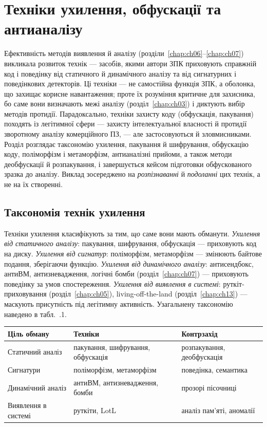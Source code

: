 \chapter{Техніки ухилення, обфускації та антианалізу}
\label{chap:ch08}

Ефективність методів виявлення й аналізу (розділи~\ref{chap:ch06}--\ref{chap:ch07}) викликала розвиток технік  --- засобів, якими автори ЗПК приховують справжній код і поведінку від статичного й динамічного аналізу та від сигнатурних і поведінкових детекторів. Ці техніки --- не самостійна функція ЗПК, а оболонка, що захищає корисне навантаження; проте їх розуміння критичне для захисника, бо саме вони визначають межі аналізу (розділ~\ref{chap:ch03}) і диктують вибір методів протидії. Парадоксально, техніки захисту коду (обфускація, пакування) походять із легітимної сфери --- захисту інтелектуальної власності й протидії зворотному аналізу комерційного ПЗ, --- але застосовуються й зловмисниками. Розділ розглядає таксономію ухилення, пакування й шифрування, обфускацію коду, поліморфізм і метаморфізм, антианалізні прийоми, а також методи деобфускації й розпакування, і завершується кейсом підготовки обфускованого зразка до аналізу. Виклад зосереджено на \emph{розпізнаванні} й \emph{подоланні} цих технік, а не на їх створенні.

\section{Таксономія технік ухилення}\label{sec:ch08-taxonomy}

Техніки ухилення класифікують за тим, \emph{що} саме вони мають обманути. \emph{Ухилення від статичного аналізу}: пакування, шифрування, обфускація --- приховують код на диску. \emph{Ухилення від сигнатур}: поліморфізм, метаморфізм --- змінюють байтове подання, зберігаючи функцію. \emph{Ухилення від динамічного аналізу}: антисендбокс, антиВМ, антизневадження, логічні бомби (розділ~\ref{chap:ch07}) --- приховують поведінку за умов спостереження. \emph{Ухилення від виявлення в системі}: руткіт-приховування (розділ~\ref{chap:ch05}), living-off-the-land (розділ~\ref{chap:ch13}) --- маскують присутність під легітимну активність. Узагальнену таксономію наведено в табл.~\thechapter.1.


\begin{center}\footnotesize
\begin{tabularx}{\linewidth}{L{26mm} Y L{20mm}}
\toprule
Ціль обману & Техніки & Контрзахід \\
\midrule
Статичний аналіз & пакування, шифрування, обфускація & розпакування, деобфускація \\
Сигнатури & поліморфізм, метаморфізм & поведінка, семантика \\
Динамічний аналіз & антиВМ, антизневадження, бомби & прозорі пісочниці \\
Виявлення в системі & руткіти, LotL & аналіз пам'яті, аномалії \\
\bottomrule
\end{tabularx}
\end{center}

